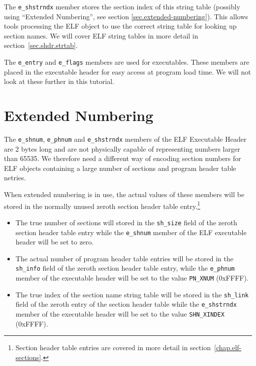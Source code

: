 \documentclass[a4paper,pdftex]{book}
\makeatletter
\newcommand{\constant}[1]{\texttt{#1}}
\newcommand{\parameter}[1]{\texttt{#1}}
\newcommand{\elfdatastructure}[1]{\textsf{#1}}
\newenvironment{callout}[2][black]{%
  \begingroup\newcommand{\@cocolor}{#1}%
  \setlength{\shadowsize}{1.2pt}%
  \newcommand{\@cogroup}[1]{#2}}{\endgroup}
\makeatother
\begin{document}
\begin{callout}{ehdr}
\begin{description}
    The \parameter{e\_shstrndx} member stores the section index of
    this string table (possibly using ``Extended Numbering'', see
    section \vref{sec.extended-numbering}). This allows tools
    processing the ELF object to use the correct string table for
    looking up section names.  We will cover ELF string tables in more
    detail in section~\vref{sec.shdr.strtab}.%
  \end{description}

  The \parameter{e\_entry} and \parameter{e\_flags} members are used
  for executables. These members are placed in the executable header
  for easy access at program load time.  We will not look at these
  further in this tutorial.
\end{callout}

\section{Extended Numbering}\label{sec.extended-numbering}%

The \parameter{e\_shnum}, \parameter{e\_phnum} and
\parameter{e\_shstrndx} members of the ELF
\elfdatastructure{Executable Header} are 2 bytes long and are not
physically capable of representing numbers larger than 65535. We
therefore need a different way of encoding section numbers for ELF
objects containing a large number of sections and program header table
netries.

When extended numbering is in use, the actual values of these members
will be stored in the normally unused zeroth section header table
entry.\footnote{Section header table entries are covered in more
  detail in section~\vref{chap.elf-sections}.}


\begin{itemize}
\item The true number of sections will stored in the
  \parameter{sh\_size} field of the zeroth section header table entry
  while the \parameter{e\_shnum} member of the ELF executable header
  will be set to zero.
\item The actual number of program header table entries will be stored
  in the \parameter{sh\_info} field of the zeroth section header table
  entry, while the \parameter{e\_phnum} member of the executable
  header will be set to the value \constant{PN\_XNUM}
  (0xFFFF).
\item The true index of the section name string table will be stored
  in the \parameter{sh\_link} field of the zeroth entry of the section
  header table while the \parameter{e\_shstrndx} member of the
  executable header will be set to the value \constant{SHN\_XINDEX}
  (0xFFFF).
\end{itemize}
\end{document}
